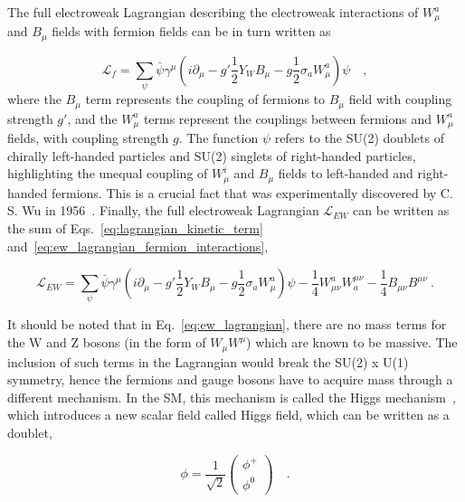 The full electroweak Lagrangian describing the electroweak interactions of $W_{\mu}^{a}$ and $B_{\mu}$ fields
with fermion fields can be in turn written as

\begin{equation}
        \mathcal{L}_{f}  = \sum_{\psi} \bar{\psi} \gamma^{\mu} \left( i \partial_{\mu} - g' \frac{1}{2} Y_{W} B_{\mu} - g \frac{1}{2} \sigma_{a} W_{\mu}^{a} \right) \psi \quad ,
    \label{eq:ew_lagrangian_fermion_interactions}
\end{equation}
where the $B_{\mu}$ term represents the coupling of fermions to $B_{\mu}$ field with coupling strength $g'$, and the $W_{\mu}^{a}$ terms
represent the couplings between fermions and $W_{\mu}^{a}$ fields, with coupling strength $g$.
The function $\psi$ refers to the SU(2) doublets of chirally left-handed particles and SU(2) singlets
of right-handed particles, highlighting the unequal coupling of $W_{\mu}^{i}$ and $B_{\mu}$ fields to left-handed and right-handed fermions.
This is a crucial fact that was experimentally discovered by C. S. Wu in 1956~\cite{Wu:1957my}. Finally, the full electroweak Lagrangian
$\mathcal{L}_{EW}$ can be written as the sum of Eqs.~\ref{eq:lagrangian_kinetic_term} and~\ref{eq:ew_lagrangian_fermion_interactions},

\begin{equation}
    \mathcal{L}_{EW} = \sum_{\psi} \bar{\psi} \gamma^{\mu} \left( i \partial_{\mu} - g' \frac{1}{2} Y_{W} B_{\mu} - g \frac{1}{2} \sigma_{a} W_{\mu}^{a} \right) \psi - \frac{1}{4} W_{\mu\nu}^{a} W^{\mu\nu}_{a} -\frac{1}{4} B_{\mu\nu} B^{\mu\nu} \ .
    \label{eq:ew_lagrangian}
\end{equation}

It should be noted that in Eq.~\ref{eq:ew_lagrangian}, there are no mass terms for the $\textrm{W}$ and $\textrm{Z}$ bosons (in the form of $W_{\mu} W^{\mu}$)
which are known to be massive. The inclusion of such terms in the Lagrangian would break the SU(2) x U(1) symmetry, hence the fermions
and gauge bosons have to acquire mass through a different mechanism. In the SM, this mechanism is called the Higgs mechanism~\cite{Higgs:1964pj}, 
which introduces a new scalar field called Higgs field, which can be written as a doublet,

\begin{equation}
    \phi = \frac{1}{\sqrt{2}} \begin{pmatrix}
        \phi^{+} \\ \phi^{0}
    \end{pmatrix} \quad .
    \label{eq:higgs_doublet}
\end{equation}

